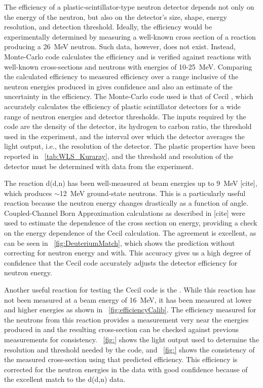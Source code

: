 The efficiency of a plastic-scintillator-type neutron detector depends not only on the energy of the neutron, but also on the detector's size, shape, energy resolution, and detection threshold.  Ideally, the efficiency would be experimentally determined by measuring a well-known cross section of a reaction producing a 26~MeV neutron.  Such data, however, does not exist.  Instead, Monte-Carlo code calculates the efficiency and is verified against reactions with well-known cross-sections and neutrons with energies of 10-25~MeV.  Comparing the calculated efficiency to measured efficiency over a range inclusive of the neutron energies produced in \reaction gives confidence and also an estimate of the uncertainty in the efficiency.  The Monte-Carlo code used is that of Cecil \cite{Cecil_neutEfficiency}, which accurately calculates the efficiency of plastic scintillator detectors for a wide range of neutron energies and detector thresholds.  The inputs required by the code are the density of the detector, its hydrogen to carbon ratio, the threshold used in the experiment, and the interval over which the detector averages the light output, i.e., the resolution of the detector.  The plastic properties have been reported in {\tab}~\ref{tab:WLS_Kuraray}, and the threshold and resolution of the detector must be determined with data from the experiment.  

The reaction d(d,n) has been well-measured at beam energies up to 9~MeV [cite], which produces $\sim$12~MeV ground-state neutrons.  This is a particularly useful reaction because the neutron energy changes drastically as a function of angle.  Coupled-Channel Born Approximation calculations as described in [cite] were used to estimate the dependence of the cross section on energy, providing a check on the energy dependence of the Cecil calculation.  The agreement is excellent, as can be seen in {\fig}~\ref{fig:DeuteriumMatch}, which shows the prediction without correcting for neutron energy and with.  This accuracy gives us a high degree of confidence that the Cecil code accurately adjusts the detector efficiency for neutron energy.  

Another useful reaction for testing the Cecil code is the \MgReaction.  While this reaction has not been measured at a beam energy of 16~MeV, it has been measured at lower and higher energies as shown in {\fig}~\ref{fig:efficiencyCalib}.  The efficiency measured for the neutrons from this reaction provides a measurement very near the energies produced in \reaction and the resulting cross-section can be checked against previous measurements for consistency.  {\fig}~\ref{fig:} shows the light output used to determine the resolution and threshold needed by the code, and {\fig}~\ref{fig:} shows the consistency of the measured cross-section using that predicted efficiency.  This efficiency is corrected for the neutron energies in the \reaction data with good confidence because of the excellent match to the d(d,n) data.


